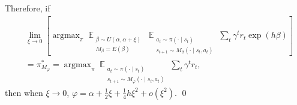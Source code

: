 Therefore, if
\begin{equation}
\begin{split}
    & \lim_{\xi \rightarrow 0}
    \left[
    \mathop{\arg\max}_{\pi}
    \mathop{\mathbb{E}}_{ 
    \substack{
    \beta \sim U(\alpha, \alpha + \xi) \\
    M_\beta = E(\beta)
    }}
    \mathop{\mathbb{E}}_{ 
    \substack{a_t \sim \pi(\cdot \mid s_t) \\ 
    s_{t+1} \sim M_\beta(\cdot \mid s_t, a_t)}}
    \sum_{t} \gamma^t r_t \exp(h \beta)
    \right] \\
    &
    = \pi_{M_\varphi}^* = \mathop{\arg\max}_{\pi}
    \mathop{\mathbb{E}}_{ 
    \substack{a_t \sim \pi(\cdot \mid s_t) \\ 
    s_{t+1} \sim M_\varphi(\cdot \mid s_t, a_t)}}
    \sum_{t} \gamma^t r_t,
\end{split}
\end{equation}
then when $\xi\rightarrow 0$, $\varphi = \alpha + \frac{1}{2}\xi + \frac{1}{4} h\xi^2 + o(\xi^2)$.
\qed